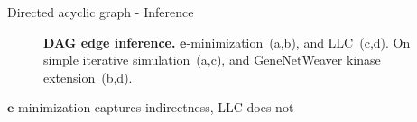 \begin{frame}{Directed acyclic graph - Inference}
\begin{figure}[ht]
\begin{subfigure}[b]{0.25\textwidth}
\end{subfigure}
\caption{\textbf{DAG edge inference.}  $\boldsymbol{e}$-minimization~(a,b), and LLC~(c,d). On simple iterative simulation~(a,c), and GeneNetWeaver kinase extension~(b,d).}
\label{fig:dag_infer}
\end{figure}
$\boldsymbol{e}$-minimization captures indirectness, LLC does not


\end{frame}
